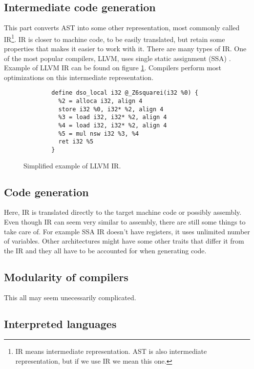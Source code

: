 \subsection{Intermediate code generation}
This part converts AST into some other representation, most commonly called IR\footnote{IR means intermediate representation.
AST is also intermediate representation, but if we use IR we mean this one.}. IR is closer to machine code, to be easily translated,
but retain some properties that makes it easier to work with it. There are many types of IR. One of the most popular compilers, LLVM, uses
single static assignment (SSA) \cite{llvm}. Example of LLVM IR can be found on figure \ref{llvm-ir-example}. Compilers perform most
optimizations on this intermediate representation.

\begin{figure}\label{llvm-ir-example}
    \begin{verbatim}
        define dso_local i32 @_Z6squarei(i32 %0) {
          %2 = alloca i32, align 4
          store i32 %0, i32* %2, align 4
          %3 = load i32, i32* %2, align 4
          %4 = load i32, i32* %2, align 4
          %5 = mul nsw i32 %3, %4
          ret i32 %5
        }
    \end{verbatim}
    \caption{Simplified example of LLVM IR.}
\end{figure}

\subsection{Code generation}
Here, IR is translated directly to the target machine code or possibly assembly. Even though IR can seem very similar to assembly,
there are still some things to take care of. For example SSA IR doesn't have registers, it uses unlimited number of variables.
Other architectures might have some other traits that differ it from the IR and they all have to be accounted for when generating code.

\subsection{Modularity of compilers}
This all may seem unecessarily complicated. 

\subsection{Interpreted languages}
